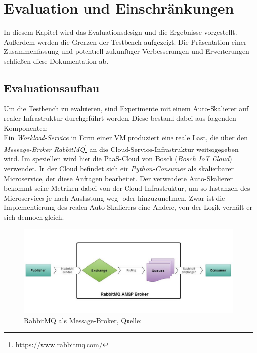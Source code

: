 \chapter{Evaluation und Einschränkungen}
\label{ch:Evaluation}
In diesem Kapitel wird das Evaluationsdesign und die Ergebnisse vorgestellt. Außerdem werden die Grenzen der Testbench aufgezeigt. Die Präsentation einer Zusammenfassung und potentiell zukünftiger Verbesserungen und Erweiterungen schließen diese Dokumentation ab.



\section{Evaluationsaufbau}
\label{sec:Evaluation:Aufbau}
Um die Testbench zu evaluieren, sind Experimente mit einem Auto-Skalierer auf realer Infrastruktur durchgeführt worden. Diese bestand dabei aus folgenden Komponenten: \\
Ein \textit{Workload-Service} in Form einer VM produziert eine reale Last, die über den \textit{Message-Broker} \textit{RabbitMQ}\footnote{https://www.rabbitmq.com/} an die Cloud-Service-Infrastruktur weitergegeben wird. Im speziellen wird hier die PaaS-Cloud von Bosch (\textit{Bosch IoT Cloud}) verwendet. In der Cloud befindet sich ein \textit{Python-Consumer} als skalierbarer Microservice, der diese Anfragen bearbeitet. Der verwendete Auto-Skalierer bekommt seine Metriken dabei von der Cloud-Infrastruktur, um so Instanzen des Microservices je nach Auslastung weg- oder hinzuzunehmen. Zwar ist die Implementierung des realen Auto-Skalierers eine Andere, von der Logik verhält er sich dennoch gleich.


\begin{figure}[!h]
	\centering
	\includegraphics[width=13cm, trim={0cm 1.3cm 0cm 0.8cm}]{img/rabbitmq.jpg}
	\caption{RabbitMQ als Message-Broker, Quelle: \cite{rabbit}}
	\label{fig:rabbit}
\end{figure}

